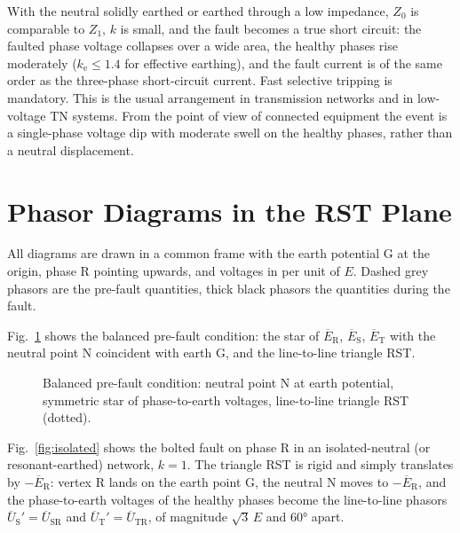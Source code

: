 \documentclass[a4paper,11pt]{article}
\newcommand{\ph}[1]{\mathrm{#1}}
\newcommand{\pE}[1]{\overline{E}_{\ph{#1}}}
\newcommand{\pU}[1]{\overline{U}_{\ph{#1}}}
\begin{document}
With the neutral solidly earthed or earthed through a low impedance,
$Z_{0}$ is comparable to $Z_{1}$, $k$ is small, and the fault becomes a true
short circuit: the faulted phase voltage collapses over a wide area, the
healthy phases rise moderately ($k_\mathrm{e}\le 1.4$ for effective earthing),
and the fault current is of the same order as the three-phase short-circuit
current. Fast selective tripping is mandatory. This is the usual arrangement
in transmission networks and in low-voltage TN systems. From the point of
view of connected equipment the event is a single-phase voltage dip with
moderate swell on the healthy phases, rather than a neutral displacement.

\section{Phasor Diagrams in the RST Plane}
\label{sec:diagrams}

All diagrams are drawn in a common frame with the earth potential G at the
origin, phase R pointing upwards, and voltages in per unit of $E$. Dashed grey
phasors are the pre-fault quantities, thick black phasors the quantities
during the fault.

Fig.~\ref{fig:healthy} shows the balanced pre-fault condition: the star of
$\pE{R}$, $\pE{S}$, $\pE{T}$ with the neutral point N coincident with earth G,
and the line-to-line triangle RST.

\begin{figure}[htb]
\centering
{}
\caption{Balanced pre-fault condition: neutral point N at earth potential,
symmetric star of phase-to-earth voltages, line-to-line triangle RST (dotted).}
\label{fig:healthy}
\end{figure}

Fig.~\ref{fig:isolated} shows the bolted fault on phase R in an
isolated-neutral (or resonant-earthed) network, $k=1$. The triangle RST is
rigid and simply translates by $-\pE{R}$: vertex R lands on the earth point G,
the neutral N moves to $-\pE{R}$, and the phase-to-earth voltages of the
healthy phases become the line-to-line phasors $\pU{S}'=\pU{SR}$ and
$\pU{T}'=\pU{TR}$, of magnitude $\sqrt{3}\,E$ and \ang{60} apart.
\end{document}
